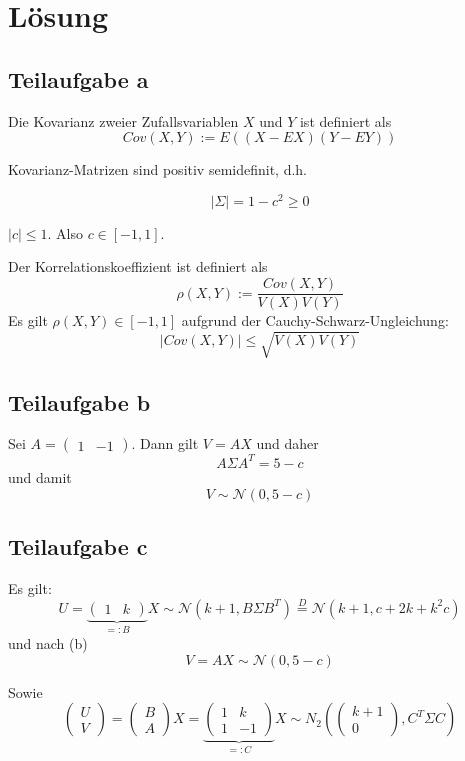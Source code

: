\section*{Lösung}
\subsection*{Teilaufgabe a}
Die Kovarianz zweier Zufallsvariablen $X$ und $Y$ ist definiert als
\[Cov(X, Y) := E((X - EX) (Y - EY))\]

Kovarianz-Matrizen sind positiv semidefinit, d.h.

\[|\Sigma| = 1 - c^2 \geq 0\]

$|c| \leq 1$. Also $c \in [-1, 1]$.

Der Korrelationskoeffizient ist definiert als
\[\rho(X, Y) := \frac{Cov(X, Y)}{V(X) V(Y)}\]
Es gilt $\rho(X, Y) \in [-1, 1]$ aufgrund der Cauchy-Schwarz-Ungleichung:
\[|Cov(X, Y)| \leq \sqrt{V(X) V(Y)}\]

\subsection*{Teilaufgabe b}
Sei $A = \begin{pmatrix}1 & -1\end{pmatrix}$. Dann gilt $V = A X$ und daher
$$A \Sigma A^T = 5 - c$$ und damit
$$V \sim \mathcal{N}(0, 5 - c)$$

\subsection*{Teilaufgabe c}
Es gilt:
\[U = \underbrace{\begin{pmatrix}1&k\end{pmatrix}}_{=: B} X \sim \mathcal{N}(k+1, B\Sigma B^T) \stackrel{D}{=} \mathcal{N}(k+1, c + 2k + k^2 c)\]
und nach (b)
\[V = AX \sim \mathcal{N}(0, 5-c)\]

Sowie
\[\begin{pmatrix}U\\V\end{pmatrix} = \begin{pmatrix}B\\A\end{pmatrix}X = \underbrace{\begin{pmatrix}1&k\\1&-1\end{pmatrix}}_{=: C}X \sim N_2(\begin{pmatrix}k+1\\0\end{pmatrix}, C^T \Sigma C)\]

